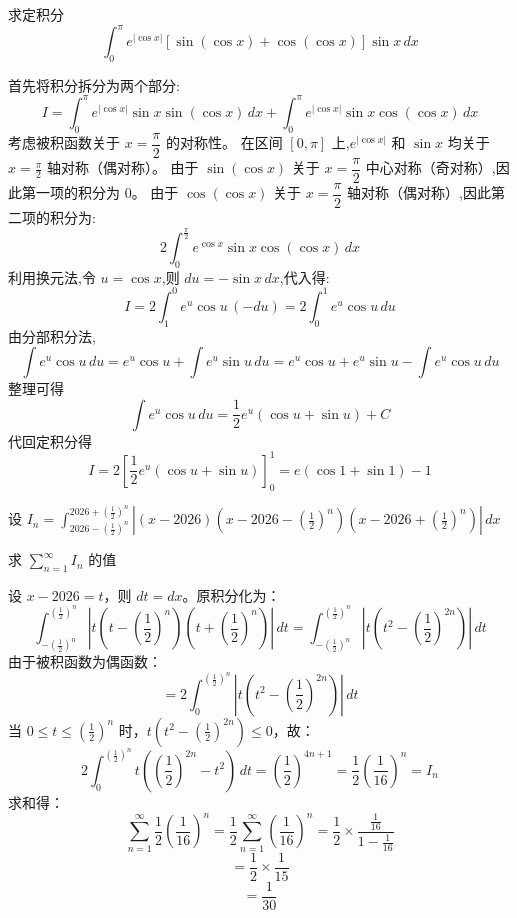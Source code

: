 \begin{questions}
    \question 求定积分
    \[
    \int_{0}^{\pi} e^{|\cos x|} [\sin(\cos x) + \cos(\cos x)] \sin x \, dx
    \]
    \begin{solution}
        首先将积分拆分为两个部分:
        \[
        I=\int_{0}^{\pi} e^{|\cos x|} \sin x \sin(\cos x) \, dx + \int_{0}^{\pi} e^{|\cos x|} \sin x \cos(\cos x) \, dx
        \]
        考虑被积函数关于 $x = \dfrac{\pi}{2}$ 的对称性。
        在区间 $[0, \pi]$ 上,$e^{|\cos x|}$ 和 $\sin x$ 均关于 $x = \frac{\pi}{2}$ 轴对称（偶对称）。
        由于 $\sin(\cos x)$ 关于 $x = \dfrac{\pi}{2}$ 中心对称（奇对称）,因此第一项的积分为 $0$。
        由于 $\cos(\cos x)$ 关于 $x = \dfrac{\pi}{2}$ 轴对称（偶对称）,因此第二项的积分为:
        \[
        2 \int_{0}^{\frac{\pi}{2}} e^{\cos x} \sin x \cos(\cos x) \, dx
        \]
        利用换元法,令 $u = \cos x$,则 $du = -\sin x \, dx$,代入得:
        \[
        I=2 \int_{1}^{0} e^u \cos u \, (-du) = 2 \int_{0}^{1} e^u \cos u \, du
        \]
        由分部积分法,
        \[
        \int e^u \cos u \, du = e^u \cos u + \int e^u \sin u \, du = e^u \cos u + e^u \sin u - \int e^u \cos u \, du
        \]
        整理可得
        \[
        \int e^u \cos u \, du = \frac{1}{2} e^u (\cos u + \sin u) + C
        \]
        代回定积分得
        \[
        I=2 \left[ \frac{1}{2} e^u (\cos u + \sin u) \right]_0^1 = e (\cos 1 + \sin 1) - 1
        \]
    \end{solution}
\question
设 $I_n = \int_{2026 - \left(\frac{1}{2}\right)^n}^{2026 + \left(\frac{1}{2}\right)^n} \left| (x - 2026) \left( x - 2026 - \left(\frac{1}{2}\right)^n \right) \left( x - 2026 + \left(\frac{1}{2}\right)^n \right) \right| \,dx$

求 $\sum_{n=1}^\infty I_n$ 的值

\begin{solution}
设 $x - 2026 = t$，则 $dt = dx$。原积分化为：
\[
\int_{-\left(\frac{1}{2}\right)^n}^{\left(\frac{1}{2}\right)^n} \left| t \left( t - \left(\frac{1}{2}\right)^n \right) \left( t + \left(\frac{1}{2}\right)^n \right) \right| \,dt = \int_{-\left(\frac{1}{2}\right)^n}^{\left(\frac{1}{2}\right)^n} \left| t \left( t^2 - \left(\frac{1}{2}\right)^{2n} \right) \right| \,dt
\]
由于被积函数为偶函数：
\[
= 2 \int_0^{\left(\frac{1}{2}\right)^n} \left| t \left( t^2 - \left(\frac{1}{2}\right)^{2n} \right) \right| \,dt
\]
当 $0 \leq t \leq \left(\frac{1}{2}\right)^n$ 时，$t \left( t^2 - \left(\frac{1}{2}\right)^{2n} \right) \leq 0$，故：
\[
2 \int_0^{\left(\frac{1}{2}\right)^n} t \left( \left(\frac{1}{2}\right)^{2n} - t^2 \right) \,dt = \left( \frac{1}{2} \right)^{4n+1} = \frac{1}{2} \left( \frac{1}{16} \right)^n = I_n
\]
求和得：
\[
\sum_{n=1}^\infty \frac{1}{2} \left( \frac{1}{16} \right)^n = \frac{1}{2} \sum_{n=1}^\infty \left( \frac{1}{16} \right)^n = \frac{1}{2} \times \frac{\frac{1}{16}}{1 - \frac{1}{16}}
\]
\[
= \frac{1}{2} \times \frac{1}{15}
\]
\[
= \frac{1}{30}
\]
\end{solution}


\end{questions}
